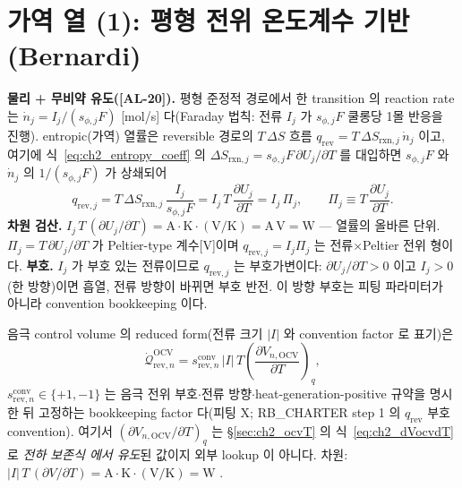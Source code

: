 \documentclass[11pt,a4paper]{article}
\newcommand{\OCV}{\mathrm{OCV}}
\newcommand{\rev}{\mathrm{rev}}
\newcommand{\rxn}{\mathrm{rxn}}
\newcommand{\conv}{\mathrm{conv}}
\newcommand{\AL}[1]{\textsf{[AL-#1]}}
\begin{document}
\section{가역 열 (1): 평형 전위 온도계수 기반 (Bernardi)}\label{sec:ch2_revOCV}
\textbf{물리 + 무비약 유도(\AL{20}).} 평형 준정적 경로에서 한 transition 의 reaction rate 는
$\dot n_j=I_j/(s_{\phi,j}F)$ [mol/s] 다(Faraday 법칙: 전류 $I_j$ 가 $s_{\phi,j}F$ 쿨롱당 1몰 반응을 진행).
entropic(가역) 열률은 reversible 경로의 $T\,\Delta S$ 흐름 $q_\rev=T\,\Delta S_{\rxn,j}\,\dot n_j$ 이고, 여기에
식~\eqref{eq:ch2_entropy_coeff} 의 $\Delta S_{\rxn,j}=s_{\phi,j}F\,\partial U_j/\partial T$ 를 대입하면
$s_{\phi,j}F$ 와 $\dot n_j$ 의 $1/(s_{\phi,j}F)$ 가 상쇄되어
\begin{equation}
\boxed{\;q_{\rev,j}=T\,\Delta S_{\rxn,j}\,\frac{I_j}{s_{\phi,j}F}=I_j\,T\,\frac{\partial U_j}{\partial T}
=I_j\,\Pi_j,\qquad \Pi_j\equiv T\,\frac{\partial U_j}{\partial T}.\;}
\label{eq:ch2_qrev}
\end{equation}
\textbf{차원 검산.} $I_j\,T\,(\partial U_j/\partial T)=\mathrm A\cdot\mathrm K\cdot(\mathrm{V/K})=\mathrm{A\,V}=\mathrm W$
— 열률의 올바른 단위. $\Pi_j=T\,\partial U_j/\partial T$ 가 Peltier-type 계수[V]이며 $q_{\rev,j}=I_j\Pi_j$ 는
전류$\times$Peltier 전위 형이다. \textbf{부호.} $I_j$ 가 부호 있는 전류이므로 $q_{\rev,j}$ 는 부호가변이다:
$\partial U_j/\partial T>0$ 이고 $I_j>0$(한 방향)이면 흡열, 전류 방향이 바뀌면 부호 반전. 이 방향 부호는 피팅
파라미터가 아니라 convention bookkeeping 이다.

음극 control volume 의 reduced form(전류 크기 $|I|$ 와 convention factor 로 표기)은
\begin{equation}
\dot{\mathcal Q}_{\rev,n}^{\OCV}=s_{\rev,n}^{\conv}\,|I|\,T\left(\frac{\partial V_{n,\OCV}}{\partial T}\right)_q,
\label{eq:ch2_revOCV}
\end{equation}
$s_{\rev,n}^{\conv}\in\{+1,-1\}$ 는 음극 전위 부호$\cdot$전류 방향$\cdot$heat-generation-positive 규약을 명시한
뒤 고정하는 bookkeeping factor 다(피팅 X; RB\_CHARTER step 1 의 $q_\rev$ 부호 convention). 여기서
$(\partial V_{n,\OCV}/\partial T)_q$ 는 \S\ref{sec:ch2_ocvT} 의 식~\eqref{eq:ch2_dVocvdT} 로 \emph{전하 보존식
에서 유도}된 값이지 외부 lookup 이 아니다. 차원: $|I|\,T\,(\partial V/\partial T)=\mathrm A\cdot\mathrm K\cdot
\mathrm{(V/K)}=\mathrm W$ \checkmark.
\end{document}

